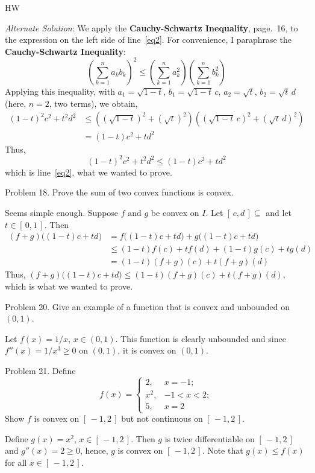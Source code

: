 \documentclass[12pt]{article}
\begin{document}
\begin{exam}{HW}
\begin{problem}[4]
\begin{solution}
\medskip\noindent\textit{Alternate Solution}:
We apply the \textbf{Cauchy-Schwartz Inequality}, page.~16, to the expression on the left side of line~\eqref{eq2}.
For convenience, I paraphrase the \textbf{Cauchy-Schwartz Inequality}:
$$
    \left(\sum_{k=1}^n a_k b_k \right)^2 \le  \left(\sum_{k=1}^n a_k^2 \right) \left(\sum_{k=1}^n b_k^2 \right)
$$
Applying this inequality, with $a_1 = \sqrt{1-t}$, $b_1 =
\sqrt{1-t}\,c$,  $a_2 = \sqrt{t}$, $b_2 = \sqrt{t}\,d$  (here,
$n=2$, two terms),  we obtain,
\begin{align*}
(1-t)^2 c^2 + t^2 d^2 &
    \le \left( (\sqrt{1-t})^2 + (\sqrt{t})^2\right)\left((\sqrt{1-t}\,c)^2 + (\sqrt{t}\,d)^2\right)\\&
    = (1-t)c^2 + td^2
\end{align*}
Thus,
$$
    (1-t)^2 c^2 + t^2 d^2 \le (1-t)c^2 + td^2
$$
which is line~\eqref{eq2}, what we wanted to prove.
\end{solution}
\end{problem}

\begin{problem}[3]
Problem 18. Prove the sum of two convex functions is convex.
\begin{solution}
Seems simple enough. Suppose $f$ and $g$ be convex on $I$. Let $[\,c,d\,]\subseteq$ and let $t\in[\,0,1\,]$. Then
\begin{align*}
    (f+g)\bigl( (1-t) c + td \bigr) &
        = f\bigl( (1-t) c + td \bigr) + g\bigl( (1-t) c + td \bigr)\\&
        \le (1-t) f(c) + tf(d) + (1-t) g(c) + tg(d)\\&
        = (1-t) (f+g)(c) + t(f+g)(d)
\end{align*}
Thus, $(f+g)\bigl( (1-t) c + td \bigr) \le (1-t) (f+g)(c) + t(f+g)(d)$, which is what we wanted to prove.
\end{solution}
\end{problem}

\begin{problem}[2]
Problem 20. Give an example of a function that is convex and unbounded on $(0,1)$.
\begin{solution}
Let $ f(x) = 1/x $, $ x \in (0,1) $. This function is clearly unbounded and since $ f''(x) = 1/x^3\ge 0$ on $(0,1)$,
it is convex on $(0,1)$.
\end{solution}
\end{problem}

\begin{problem}[4]
Problem 21. Define
$$
    f(x) = \begin{cases}
                2, & x = -1;\\
                x^2, & -1 < x < 2;\\
                5,   & x = 2
           \end{cases}
$$
Show $f$ is convex on $[\,-1,2\,]$ but not continuous on  $[\,-1,2\,]$.
\begin{solution}
Define $g(x) = x^2$, $x\in[\,-1,2\,]$. Then $g$ is twice differentiable on $[\,-1,2\,]$ and $ g''(x) = 2\ge 0$, hence,
$g$ is convex on $[\,-1,2\,]$. Note that $ g(x) \le f(x) $ for all $x\in[\,-1,2\,]$.


\end{solution}
\end{problem}
\end{exam}
\end{document}
